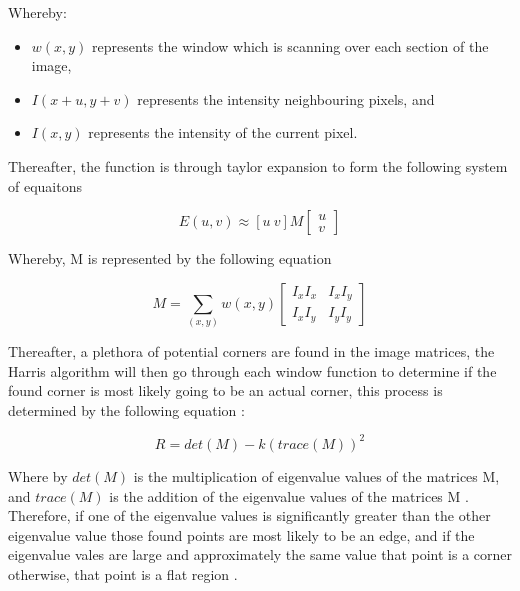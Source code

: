 \documentclass[conference]{IEEEtran}
\begin{document}
Whereby:
\begin{itemize}
	\item $w(x,y)$ represents the window which is scanning over each section of the image,
	\item $I(x + u, y + v)$ represents the intensity neighbouring pixels, and
	\item $I(x,y)$ represents the intensity of the current pixel.
\end{itemize}

Thereafter, the function is through taylor expansion to form the following system of equaitons

\begin{equation}
	E(u,v) \approx [u\ v] M
	\begin{bmatrix}
	u \\ v
	\end{bmatrix}
\end{equation}

Whereby, M is represented by the following equation

\begin{equation}
	M = \sum\limits_{(x,y)} w(x,y)
	\begin{bmatrix}
		I_{x} I_{x} & I_{x} I_{y} \\
		I_{x} I_{y} & I_{y} I_{y}
	\end{bmatrix}
\end{equation}

Thereafter, a plethora of potential corners are found in the image matrices, the Harris algorithm will then go through each window function to determine if the found corner is most likely going to be an actual corner, this process is determined by the following equation \cite{b2}:

\begin{equation}
	R = det(M) - k(trace(M))^{2}
\end{equation}

Where by $det(M)$ is the multiplication of eigenvalue values of the matrices M, and $trace(M)$ is the addition of the eigenvalue values of the matrices M \cite{b2}. Therefore, if one of the eigenvalue values is significantly greater than the other eigenvalue value those found points are most likely to be an edge, and if the eigenvalue vales are large and approximately the same value that point is a corner otherwise, that point is a flat region \cite{b2}.\par
\end{document}

